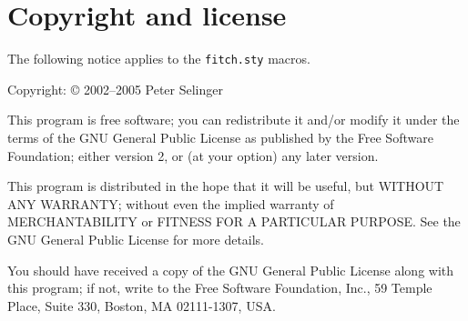 \documentclass[10pt]{article}
\begin{document}
\section{Copyright and license}

The following notice applies to the \verb!fitch.sty! macros.

Copyright: {\copyright} 2002--2005 Peter Selinger

This program is free software; you can redistribute it and/or modify
it under the terms of the GNU General Public License as published by
the Free Software Foundation; either version 2, or (at your option)
any later version.

This program is distributed in the hope that it will be useful, but
WITHOUT ANY WARRANTY; without even the implied warranty of
MERCHANTABILITY or FITNESS FOR A PARTICULAR PURPOSE. See the GNU
General Public License for more details.

You should have received a copy of the GNU General Public License
along with this program; if not, write to the Free Software Foundation,
Inc., 59 Temple Place, Suite 330, Boston, MA 02111-1307, USA.
\end{document}
